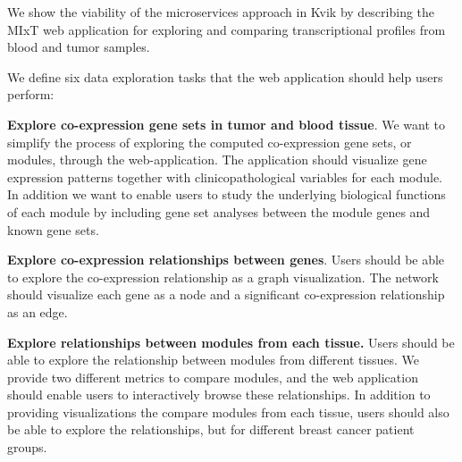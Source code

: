 %
%
We show the viability of the microservices approach in Kvik by describing the
MIxT web application for exploring and comparing
transcriptional profiles from blood and tumor samples. 

We define six data exploration tasks that the web application should help users
perform: 

\textbf{Explore co-expression gene sets in tumor and blood tissue}. We want to
simplify the process of exploring the computed co-expression gene sets, or
modules, through the web-application. The application should 
visualize gene expression patterns together with clinicopathological variables
for each module. In addition we want to enable users to study the underlying
biological functions of each module by including gene set analyses between the
module genes and known gene sets. 

\textbf{Explore co-expression relationships between genes}. Users should be able
to explore the co-expression relationship as a graph visualization. The network
should visualize each gene as a node and a significant co-expression
relationship as an edge.  

\textbf{Explore relationships between modules from each tissue.} Users should be
able to explore the relationship between modules from different tissues. We
provide two different metrics to compare modules, and the web application should
enable users to interactively browse these relationships. In addition to
providing visualizations the compare modules from each tissue, users should also
be able to explore the relationships, but for different breast cancer patient
groups. 

